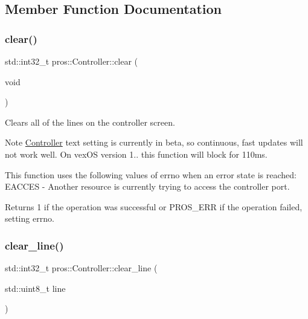 \subsection{Member Function Documentation}
\mbox{\label{classpros_1_1Controller_a49a332fe032c3aaf94e24bb3a51945e1}} 
\subsubsection{\texorpdfstring{clear()}{clear()}}
{\footnotesize\ttfamily std\+::int32\+\_\+t pros\+::\+Controller\+::clear (\begin{DoxyParamCaption}\item[{void}]{ }\end{DoxyParamCaption})}

Clears all of the lines on the controller screen.

\begin{DoxyNote}{Note}
\hyperlink{classpros_1_1Controller}{Controller} text setting is currently in beta, so continuous, fast updates will not work well. On vex\+OS version 1.. this function will block for 110ms.
\end{DoxyNote}
This function uses the following values of errno when an error state is reached\+: E\+A\+C\+C\+ES -\/ Another resource is currently trying to access the controller port.

\begin{DoxyReturn}{Returns}
1 if the operation was successful or P\+R\+O\+S\+\_\+\+E\+RR if the operation failed, setting errno. 
\end{DoxyReturn}
\mbox{\label{classpros_1_1Controller_a9f65f6c26d55619a658aa103d3532583}} 
\subsubsection{\texorpdfstring{clear\+\_\+line()}{clear\_line()}}
{\footnotesize\ttfamily std\+::int32\+\_\+t pros\+::\+Controller\+::clear\+\_\+line (\begin{DoxyParamCaption}\item[{std\+::uint8\+\_\+t}]{line }\end{DoxyParamCaption})}

